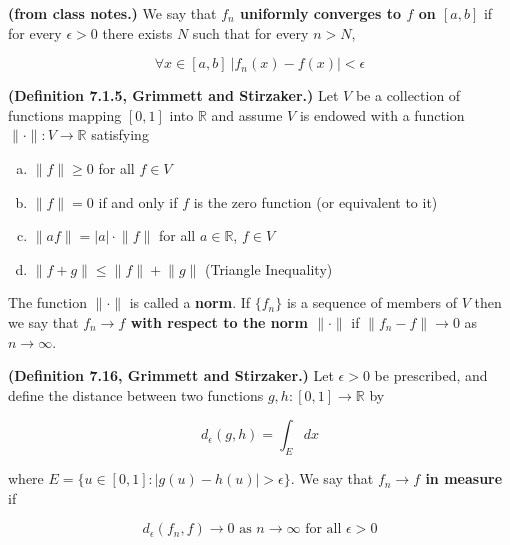 \begin{definition} \textbf{(from class notes.)} We say that \textbf{ \(f_n\) \textbf{uniformly converges} to \(f\) on \([a, b]\)} if for every \(\epsilon > 0\) there exists \(N\) such that for every \(n > N\),

\[
\forall x \in [a, b] \ |f_n(x) - f(x)| < \epsilon
\]

\end{definition}

\begin{definition} \textbf{(Definition 7.1.5, Grimmett and Stirzaker.)} Let \(V\) be a collection of functions mapping \([0, 1]\) into \(\mathbb{R}\) and assume \(V\) is endowed with a function \(\lVert \cdot \rVert : V \to \mathbb{R}\) satisfying

\begin{enumerate}[(a)]

\item \(\lVert f \rVert \geq 0\) for all \(f \in V\)

\item \(\lVert f \rVert = 0\) if and only if \(f\) is the zero function (or equivalent to it)

\item \(\lVert af \rVert = |a| \cdot \lVert f \rVert \) for all \(a \in \mathbb{R}\), \(f \in V\)

\item \(\lVert f + g \rVert \leq \lVert f \rVert + \lVert g \rVert \) (Triangle Inequality)

\end{enumerate}

The function \(\lVert \cdot \rVert\) is called a \textbf{norm}. If \(\{f_n\}\) is a sequence of members of \(V\) then we say that \textbf{\(f_n \to f\) with respect to the norm \(\lVert \cdot \rVert\)} if \(\lVert f_n - f \rVert \to 0 \) as \(n \to \infty\).

\end{definition}

\begin{definition} \textbf{(Definition 7.16, Grimmett and Stirzaker.)} Let \(\epsilon > 0\) be prescribed, and define the distance between two functions \(g, h: [0, 1] \to \mathbb{R}\) by

\[
d_\epsilon(g,h) = \int_E dx
\]

where \(E = \{ u \in[0, 1] : |g(u) - h(u)| > \epsilon \}\). We say that \textbf{ \(f_n \to f\) in measure} if 

\[
d_\epsilon(f_n, f) \to 0 \text{ as } n \to \infty \text{ for all } \epsilon > 0
\]

\end{definition}

